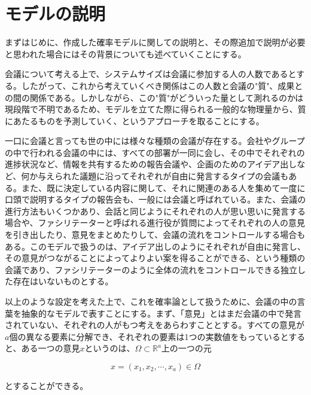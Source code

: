 \section{モデルの説明}

まずはじめに、作成した確率モデルに関しての説明と、その際追加で説明が必要と思われた場合にはその背景についても述べていくことにする。

会議について考える上で、システムサイズは会議に参加する人の人数であるとする。したがって、これから考えていくべき関係はこの人数と会議の"質"、成果との間の関係である。しかしながら、この"質"がどういった量として測れるのかは現段階で不明であるため、モデルを立てた際に得られる一般的な物理量から、質にあたるものを予測していく、というアプローチを取ることにする。

一口に会議と言っても世の中には様々な種類の会議が存在する。会社やグループの中で行われる会議の中には、すべての部署が一同に会し、その中でそれぞれの進捗状況など、情報を共有するための報告会議や、企画のためのアイデア出しなど、何か与えられた議題に沿ってそれぞれが自由に発言するタイプの会議もある。また、既に決定している内容に関して、それに関連のある人を集めて一度に口頭で説明するタイプの報告会も、一般には会議と呼ばれている。また、会議の進行方法もいくつかあり、会話と同じようにそれぞれの人が思い思いに発言する場合や、ファシリテーターと呼ばれる進行役が質問によってそれぞれの人の意見を引き出したり、意見をまとめたりして、会議の流れをコントロールする場合もある。このモデルで扱うのは、アイデア出しのようにそれぞれが自由に発言し、その意見がつながることによってよりよい案を得ることができる、という種類の会議であり、ファシリテーターのように全体の流れをコントロールできる独立した存在はいないものとする。

以上のような設定を考えた上で、これを確率論として扱うために、会議の中の言葉を抽象的なモデルで表すことにする。まず、「意見」とはまだ会議の中で発言されていない、それぞれの人がもつ考えをあらわすこととする。すべての意見が$a$個の異なる要素に分解でき、それぞれの要素は1つの実数値をもっているとすると、ある一つの意見$x$というのは、$\Omega \subset \mathbb{R}^{a}$上の一つの元

$$x = (x_{1}, x_{2}, \cdots ,x_{a}) \in \Omega$$

とすることができる。

